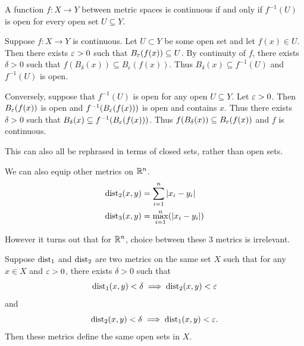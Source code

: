 \documentclass[letterpaper, 11pt]{article}
\begin{document}
\begin{prop}
  A function $f\colon X \to Y$ between metric spaces is continuous if and only if $f^{-1}(U)$ is open for every open set $U \subseteq Y$.
\end{prop}

\begin{pf}
  Suppose $f\colon X \to Y$ is continuous.
  Let $U \subset Y$ be some open set and let $f(x) \in U$.
  Then there exists $\varepsilon > 0$ such that $B_{\varepsilon}(f(x)) \subseteq U$.
  By continuity of $f$, there exists $\delta > 0$ such that $f(B_{\delta}(x)) \subseteq B_{e}(f(x))$.
  Thus $B_{\delta}(x) \subseteq f^{-1}(U)$ and $f^{-1}(U)$ is open.

  Conversely, suppose that $f^{-1}(U)$ is open for any open $U \subseteq Y$.
  Let $\varepsilon > 0$.
  Then $B_{\varepsilon}(f(x))$ is open and $f^{-1}(B_{\varepsilon}(f(x)))$ is open and contains $x$.
  Thus there exists $\delta > 0$ such that $B_{\delta}(x) \subseteq f^{-1}(B_{\varepsilon}(f(x)))$.
  Thus $f(B_{\delta}(x)) \subseteq B_{\varepsilon}(f(x))$ and $f$ is continuous.
\end{pf}

This can also all be rephrased in terms of closed sets, rather than open sets.

\clearpage

\begin{ex}
  We can also equip other metrics on $\mathbb{R}^{n}$.
  \begin{align*}
    \operatorname{dist}_{2}(x, y) &= \sum_{i = 1}^{n} \abs{x_{i} - y_{i}} \\
    \operatorname{dist}_{3}(x, y) &= \max_{i = 1}^{n} (\abs{x_{i} - y_{i}})
  \end{align*}
\end{ex}

However it turns out that for $\mathbb{R}^{n}$, choice between these 3 metrics is irrelevant.

\begin{prop}
  Suppose $\operatorname{dist}_{1}$ and $\operatorname{dist}_{2}$ are two metrics on the same set $X$ such that for any $x \in X$ and $\varepsilon > 0$, there exists $\delta > 0$ such that
  \[
    \operatorname{dist}_{1}(x, y) < \delta \implies \operatorname{dist}_{2}(x, y) < \varepsilon
  \]
  and
  \[
    \operatorname{dist}_{2}(x, y) < \delta \implies \operatorname{dist}_{1}(x, y) < \varepsilon.
  \]
  Then these metrics define the same open sets in $X$.
\end{prop}

\begin{pf}
\end{pf}
\end{document}
